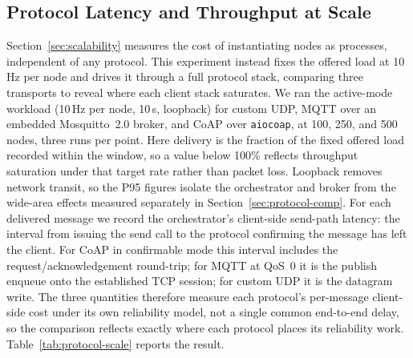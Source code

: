 \documentclass[jsan,article,submit,moreauthors,pdftex]{Definitions/mdpi}
\begin{document}
\subsection{Protocol Latency and Throughput at Scale}
\label{sec:protocol-scale}

Section~\ref{sec:scalability} measures the cost of instantiating nodes as processes, independent of any protocol. This experiment instead fixes the offered load at 10\,Hz per node and drives it through a full protocol stack, comparing three transports to reveal where each client stack saturates. We ran the active-mode workload (10\,Hz per node, 10\,s, loopback) for custom UDP, MQTT over an embedded Mosquitto~2.0 broker, and CoAP over \texttt{aiocoap}, at 100, 250, and 500 nodes, three runs per point. Here delivery is the fraction of the fixed offered load recorded within the window, so a value below 100\% reflects throughput saturation under that target rate rather than packet loss. Loopback removes network transit, so the P95 figures isolate the orchestrator and broker from the wide-area effects measured separately in Section~\ref{sec:protocol-comp}. For each delivered message we record the orchestrator's client-side send-path latency: the interval from issuing the send call to the protocol confirming the message has left the client. For CoAP in confirmable mode this interval includes the request/acknowledgement round-trip; for MQTT at QoS~0 it is the publish enqueue onto the established TCP session; for custom UDP it is the datagram write. The three quantities therefore measure each protocol's per-message client-side cost under its own reliability model, not a single common end-to-end delay, so the comparison reflects exactly where each protocol places its reliability work. Table~\ref{tab:protocol-scale} reports the result.
\end{document}
